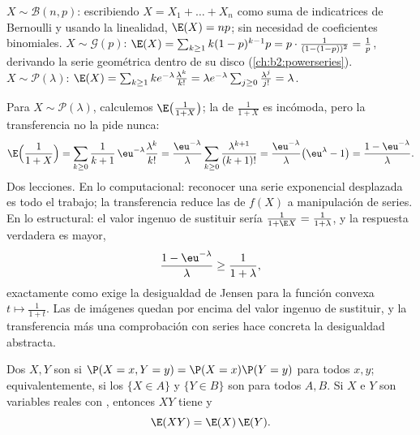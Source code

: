 \begin{example}\label{ex:b2:randomvar:expectations}
$X \sim \mathcal{B}(n, p)$: escribiendo $X = X_1 + \dots + X_n$ como
suma de indicatrices de Bernoulli y usando la linealidad, $\E(X) =
np$; sin necesidad de coeficientes binomiales. $X \sim
\mathcal{G}(p)$: $\E(X) = \sum_{k\geq1}k(1-p)^{k-1}p =
p\cdot\frac{1}{(1 - (1-p))^2} = \frac1p$, derivando la serie
geométrica dentro de su disco (\cref{ch:b2:powerseries}). $X \sim
\mathcal{P}(\lambda)$: $\E(X) = \sum_{k\geq1}k
e^{-\lambda}\frac{\lambda^k}{k!} = \lambda
e^{-\lambda}\sum_{j\geq0}\frac{\lambda^j}{j!} = \lambda$.
\end{example}

\begin{example}\label{ex:b2:randomvar:transferex}
Para $X \sim \mathcal P(\lambda)$, calculemos
$\E\bigl(\frac1{1+X}\bigr)$; la  de $\frac1{1+X}$ es incómoda,
pero la transferencia no la pide nunca:
\[
\E\Bigl(\frac1{1+X}\Bigr)
= \sum_{k\geq0}\frac{1}{k+1}\,\eu^{-\lambda}
\frac{\lambda^k}{k!}
= \frac{\eu^{-\lambda}}{\lambda}\sum_{k\geq0}
\frac{\lambda^{k+1}}{(k+1)!}
= \frac{\eu^{-\lambda}}{\lambda}\bigl(\eu^\lambda - 1\bigr)
= \frac{1 - \eu^{-\lambda}}{\lambda} .
\]
Dos lecciones. En lo computacional: reconocer una serie exponencial
desplazada es todo el trabajo; la transferencia reduce las
 de $f(X)$ a manipulación de series. En lo estructural:
el valor ingenuo de sustituir sería $\frac1{1 + \E X} = \frac1{1 +
\lambda}$, y la respuesta verdadera es mayor,
\[
\frac{1 - \eu^{-\lambda}}{\lambda} \geq
\frac{1}{1 + \lambda},
\]
exactamente como exige la desigualdad de Jensen para la función
convexa $t \mapsto \frac1{1+t}$. Las  de imágenes
 quedan por encima del valor ingenuo de sustituir, y la
transferencia más una comprobación con series hace concreta la
desigualdad abstracta.
\end{example}

\begin{theorem}\label{thm:b2:randomvar:product}
Dos  $X, Y$ son \emph{} si $\P(X =
x, Y = y) = \P(X = x)\P(Y = y)$ para todos $x, y$; equivalentemente,
si los  $\{X \in A\}$ y $\{Y \in B\}$ son  para
todos $A, B$. Si $X$ e $Y$ son variables reales  con
, entonces $XY$ tiene  y
\[
\E(XY) = \E(X)\,\E(Y) .
\]
\end{theorem}

